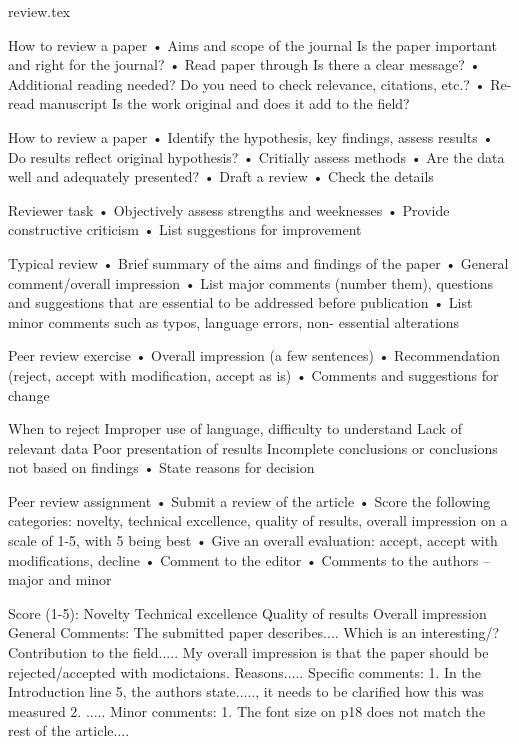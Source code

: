review.tex

How to review a paper
• Aims and scope of the journal
Is the paper important and right for the journal?
• Read paper through
Is there a clear message?
• Additional reading needed?
Do you need to check relevance, citations, etc.?
• Re-read manuscript
Is the work original and does it add to the field?

How to review a paper
• Identify the hypothesis, key findings, assess results
• Do results reflect original hypothesis?
• Critially assess methods
• Are the data well and adequately presented?
• Draft a review
• Check the details

Reviewer task
• Objectively assess strengths and weeknesses
• Provide constructive criticism
• List suggestions for improvement

Typical review
• Brief summary of the aims and findings of the paper
• General comment/overall impression
• List major comments (number them), questions and
suggestions that are essential to be addressed before
publication
• List minor comments such as typos, language errors, non-
essential alterations

Peer review exercise
• Overall impression (a few sentences)
• Recommendation (reject, accept with modification, accept as is)
• Comments and suggestions for change

When to reject
Improper use of language, difficulty to understand
Lack of relevant data
Poor presentation of results
Incomplete conclusions or conclusions not based on findings
• State reasons for decision

Peer review assignment
• Submit a review of the article
• Score the following categories: novelty, technical excellence, quality of
results, overall impression on a scale of 1-5, with 5 being best
• Give an overall evaluation: accept, accept with modifications, decline
• Comment to the editor
• Comments to the authors – major and minor

Score (1-5):
Novelty
Technical excellence
Quality of results
Overall impression
General Comments:
The submitted paper describes.... Which is an interesting/? Contribution to
the field..... My overall impression is that the paper should be
rejected/accepted with modictaions. Reasons.....
Specific comments:
1. In the Introduction line 5, the authors state....., it needs to be clarified
how this was measured
2. .....
Minor comments:
1. The font size on p18 does not match the rest of the article....